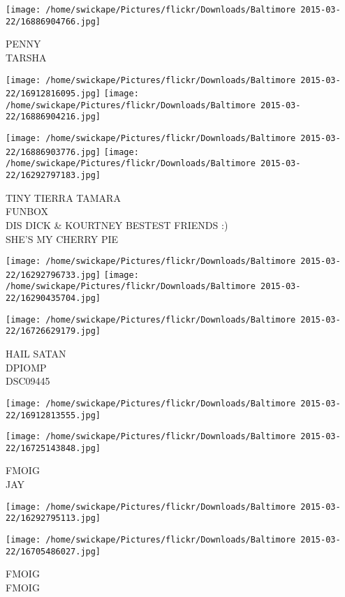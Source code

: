 \documentclass[10pt,letterpaper]{article}
\begin{document}
\vspace{0.25in}
\texttt{[image: /home/swickape/Pictures/flickr/Downloads/Baltimore 2015-03-22/16886904766.jpg]}

PENNY\\
TARSHA
\pagebreak

\texttt{[image: /home/swickape/Pictures/flickr/Downloads/Baltimore 2015-03-22/16912816095.jpg]}
\texttt{[image: /home/swickape/Pictures/flickr/Downloads/Baltimore 2015-03-22/16886904216.jpg]}

\texttt{[image: /home/swickape/Pictures/flickr/Downloads/Baltimore 2015-03-22/16886903776.jpg]}
\texttt{[image: /home/swickape/Pictures/flickr/Downloads/Baltimore 2015-03-22/16292797183.jpg]}

TINY TIERRA TAMARA\\
FUNBOX\\
DIS DICK \& KOURTNEY BESTEST FRIENDS :)\\
SHE'S MY CHERRY PIE
\pagebreak

\texttt{[image: /home/swickape/Pictures/flickr/Downloads/Baltimore 2015-03-22/16292796733.jpg]}
\texttt{[image: /home/swickape/Pictures/flickr/Downloads/Baltimore 2015-03-22/16290435704.jpg]}

\vspace{0.25in}
\texttt{[image: /home/swickape/Pictures/flickr/Downloads/Baltimore 2015-03-22/16726629179.jpg]}

HAIL SATAN\\
DPIOMP\\
DSC09445
\pagebreak

\texttt{[image: /home/swickape/Pictures/flickr/Downloads/Baltimore 2015-03-22/16912813555.jpg]}

\vspace{0.25in}
\texttt{[image: /home/swickape/Pictures/flickr/Downloads/Baltimore 2015-03-22/16725143848.jpg]}

FMOIG\\
JAY
\pagebreak

\texttt{[image: /home/swickape/Pictures/flickr/Downloads/Baltimore 2015-03-22/16292795113.jpg]}

\vspace{0.25in}
\texttt{[image: /home/swickape/Pictures/flickr/Downloads/Baltimore 2015-03-22/16705486027.jpg]}

FMOIG\\
FMOIG
\pagebreak
\end{document}
